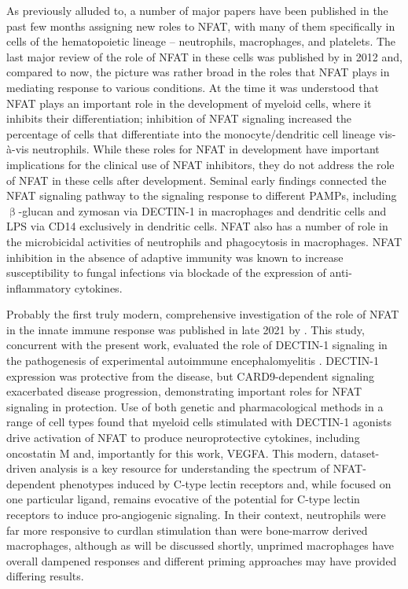 As previously alluded to, a number of major papers have been published in the past few months assigning new roles to NFAT, with many of them specifically in cells of the hematopoietic lineage -- neutrophils, macrophages, and platelets. The last major review of the role of NFAT in these cells was published by \citeauthor{Fric2012a} in 2012 and, compared to now, the picture was rather broad in the roles that NFAT plays in mediating response to various conditions. At the time it was understood that NFAT plays an important role in the development of myeloid cells, where it inhibits their differentiation; inhibition of NFAT signaling increased the percentage of cells that differentiate into the monocyte/dendritic cell lineage vis\hyp{}\`{a}\hyp{}vis neutrophils. While these roles for NFAT in development have important implications for the clinical use of NFAT inhibitors, they do not address the role of NFAT in these cells after development. Seminal early findings connected the NFAT signaling pathway to the signaling response to different PAMPs, including $\upbeta$\hyp{}glucan and zymosan via DECTIN\hyp{}1 in macrophages and dendritic cells and LPS via CD14 exclusively in dendritic cells. NFAT also has a number of role in the microbicidal activities of neutrophils and phagocytosis in macrophages. NFAT inhibition in the absence of adaptive immunity was known to increase susceptibility to fungal infections via blockade of the expression of anti\hyp{}inflammatory cytokines. 

Probably the first truly modern, comprehensive investigation of the role of NFAT in the innate immune response was published in late 2021 by \citeauthor{Deerhake2021}. This study, concurrent with the present work, evaluated the role of DECTIN\hyp{}1 signaling in the pathogenesis of experimental autoimmune encephalomyelitis \citep{Deerhake2021}. DECTIN\hyp{}1 expression was protective from the disease, but CARD9\hyp{}dependent signaling exacerbated disease progression, demonstrating important roles for NFAT signaling in protection. Use of both genetic and pharmacological methods in a range of cell types found that myeloid cells stimulated with DECTIN\hyp{}1 agonists drive activation of NFAT to produce neuroprotective cytokines, including oncostatin M and, importantly for this work, VEGFA. This modern, dataset\hyp{}driven analysis is a key resource for understanding the spectrum of NFAT\hyp{}dependent phenotypes induced by C\hyp{}type lectin receptors and, while focused on one particular ligand, remains evocative of the potential for C\hyp{}type lectin receptors to induce pro\hyp{}angiogenic signaling. In their context, neutrophils were far more responsive to curdlan stimulation than were bone\hyp{}marrow derived macrophages, although as will be discussed shortly, unprimed macrophages have overall dampened responses and different priming approaches may have provided differing results.

